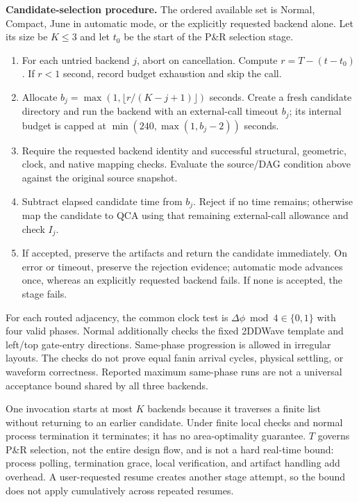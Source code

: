 \documentclass[11pt,a4paper]{article}
\begin{document}
\textbf{Candidate-selection procedure.} The ordered available set is Normal, Compact, June in automatic mode, or the explicitly requested backend alone. Let its size be $K\le3$ and let $t_0$ be the start of the P\&R selection stage.
\begin{enumerate}[leftmargin=18pt,itemsep=1pt,parsep=0pt,topsep=4pt]
\item For each untried backend $j$, abort on cancellation. Compute $r=T-(t-t_0)$. If $r<1$ second, record budget exhaustion and skip the call.
\item Allocate $b_j=\max(1,\lfloor r/(K-j+1)\rfloor)$ seconds. Create a fresh candidate directory and run the backend with an external-call timeout $b_j$; its internal budget is capped at $\min(240,\max(1,b_j-2))$ seconds.
\item Require the requested backend identity and successful structural, geometric, clock, and native mapping checks. Evaluate the source/DAG condition above against the original source snapshot.
\item Subtract elapsed candidate time from $b_j$. Reject if no time remains; otherwise map the candidate to QCA using that remaining external-call allowance and check $I_j$.
\item If accepted, preserve the artifacts and return the candidate immediately. On error or timeout, preserve the rejection evidence; automatic mode advances once, whereas an explicitly requested backend fails. If none is accepted, the stage fails.
\end{enumerate}

For each routed adjacency, the common clock test is $\Delta\phi\bmod4\in\{0,1\}$ with four valid phases. Normal additionally checks the fixed 2DDWave template and left/top gate-entry directions. Same-phase progression is allowed in irregular layouts. The checks do not prove equal fanin arrival cycles, physical settling, or waveform correctness. Reported maximum same-phase runs are not a universal acceptance bound shared by all three backends.

One invocation starts at most $K$ backends because it traverses a finite list without returning to an earlier candidate. Under finite local checks and normal process termination it terminates; it has no area-optimality guarantee. $T$ governs P\&R selection, not the entire design flow, and is not a hard real-time bound: process polling, termination grace, local verification, and artifact handling add overhead. A user-requested resume creates another stage attempt, so the bound does not apply cumulatively across repeated resumes.
\end{document}
